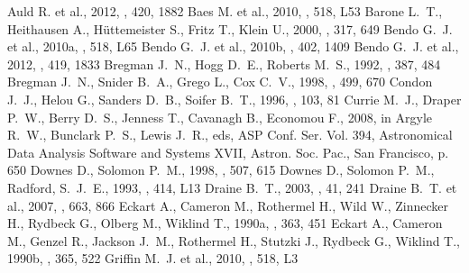 \begin{thebibliography}{}
 Auld R. et al., 2012, \mnras, 420, 1882
 Baes M. et al., 2010, \aap, 518, L53
 Barone L.~T., Heithausen A., H{\"u}ttemeister S., Fritz T., Klein U., 2000, \mnras, 317, 649
 Bendo G.~J. et al., 2010a, \aap, 518, L65
 Bendo G.~J. et al., 2010b, \mnras, 402, 1409
 Bendo G.~J. et al., 2012, \mnras, 419, 1833
 Bregman J.~N., Hogg D.~E., Roberts M.~S., 1992, \apj, 387, 484
 Bregman J.~N., Snider B.~A., Grego L., Cox C.~V., 1998, \apj, 499, 670
 Condon J.~J., Helou G., Sanders D.~B., Soifer B.~T., 1996, \apjs, 103, 81
 Currie M.~J., Draper P.~W., Berry D.~S., Jenness T., Cavanagh B., Economou F., 2008, in Argyle R.~W., Bunclark P.~S., Lewis J.~R., eds, ASP Conf. Ser. Vol. 394, Astronomical Data Analysis Software and Systems XVII, Astron. Soc. Pac., San Francisco, p. 650
 Downes D., Solomon P.~M., 1998, \apj, 507, 615
 Downes D., Solomon P.~M., Radford, S.~J.~E., 1993, \apjl, 414, L13
 Draine B.~T., 2003, \araa, 41, 241
 Draine B.~T. et al., 2007, \apj, 663, 866
 Eckart A., Cameron M., Rothermel H., Wild W., Zinnecker H., Rydbeck G., Olberg M., Wiklind T., 1990a, \apj, 363, 451
 Eckart A., Cameron M., Genzel R., Jackson J.~M., Rothermel H., Stutzki J., Rydbeck G., Wiklind T., 1990b, \apj, 365, 522
 Griffin M.~J. et al., 2010, \aap, 518, L3

\end{thebibliography}
